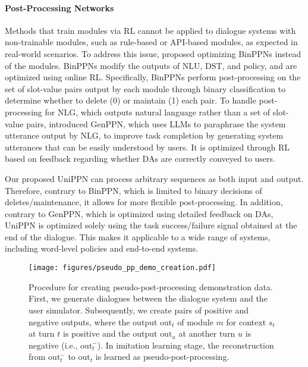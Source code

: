 \paragraph{Post-Processing Networks}
Methods that train modules via RL cannot be applied to dialogue systems with non-trainable modules, such as rule-based or API-based modules, as expected in real-world scenarios. To address this issue, \citet{ohashi-higashinaka-2022-post} proposed optimizing BinPPNs instead of the modules. BinPPNs modify the outputs of NLU, DST, and policy, and are optimized using online RL. Specifically, BinPPNs perform post-processing on the set of slot-value pairs output by each module through binary classification to determine whether to delete (0) or maintain (1) each pair. To handle post-processing for NLG, which outputs natural language rather than a set of slot-value pairs, \citet{ohashi-higashinaka-2023-enhancing} introduced GenPPN, which uses LLMs to paraphrase the system utterance output by NLG, to improve task completion by generating system utterances that can be easily understood by users. It is optimized through RL based on  feedback regarding whether DAs are correctly conveyed to users.

Our proposed UniPPN can process arbitrary sequences as both input and output. Therefore, contrary to BinPPN, which is limited to binary decisions of deletes/maintenance, it allows for more flexible post-processing. In addition, contrary to GenPPN, which is optimized using detailed feedback on DAs, UniPPN is optimized solely using the task success/failure signal obtained at the end of the dialogue. This makes it applicable to a wide range of systems, including word-level policies and end-to-end systems.

\begin{figure*}
\centering
\texttt{[image: figures/pseudo\_pp\_demo\_creation.pdf]}
\caption{Procedure for creating pseudo-post-processing demonstration data. First, we generate dialogues between the dialogue system and the user simulator. Subsequently, we create pairs of positive and negative outputs, where the output $\text{out}_t$ of module $m$ for context $s_t$ at turn $t$ is positive and the output $\text{out}_u$ at another turn $u$ is negative (i.e., $\text{out}_t^-$). In imitation learning stage, the reconstruction from $\text{out}_t^-$ to $\text{out}_t$ is learned as pseudo-post-processing.}
\label{fig:pseudo_pp_demo_creation}
\end{figure*}